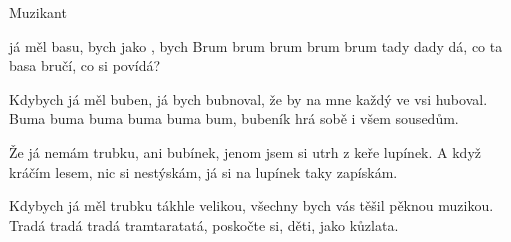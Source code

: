 \begin{TEXT}{Muzikant}
                          
\SLOKA {} já měl basu,  bych jako ,\NL
{}   bych \NL
Brum brum brum brum brum tady dady dá,\NL
co ta basa bručí, co si povídá?

\SLOKA Kdybych já měl buben, já bych bubnoval,\NL
že by na mne každý ve vsi huboval.\NL
Buma buma buma buma buma bum,\NL
bubeník hrá sobě i všem sousedům.

\SLOKA Že já nemám trubku, ani bubínek,\NL
jenom jsem si utrh z keře lupínek.\NL
A když kráčím lesem, nic si nestýskám,\NL
já si na lupínek taky zapískám.

\SLOKA Kdybych já měl trubku tákhle velikou,\NL
všechny bych vás těšil pěknou muzikou.\NL
Tradá tradá tradá tramtaratatá,\NL
poskočte si, děti, jako kůzlata.
\end{TEXT}